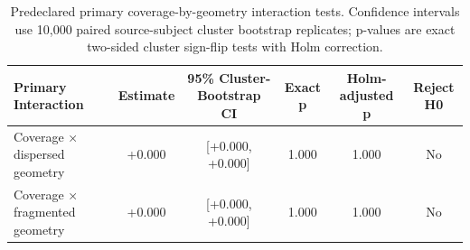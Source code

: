 \begin{table}[t]
\centering
\small
\caption{Predeclared primary coverage-by-geometry interaction tests. Confidence intervals use 10,000 paired source-subject cluster bootstrap replicates; p-values are exact two-sided cluster sign-flip tests with Holm correction.}
\label{tab:cova_primary_interactions}
\begin{tabular}{lccccc}
\toprule
Primary Interaction & Estimate & 95\% Cluster-Bootstrap CI & Exact p & Holm-adjusted p & Reject H0 \\
\midrule
Coverage × dispersed geometry & +0.000 & [+0.000, +0.000] & 1.000 & 1.000 & No \\
Coverage × fragmented geometry & +0.000 & [+0.000, +0.000] & 1.000 & 1.000 & No \\
\bottomrule
\end{tabular}
\end{table}
